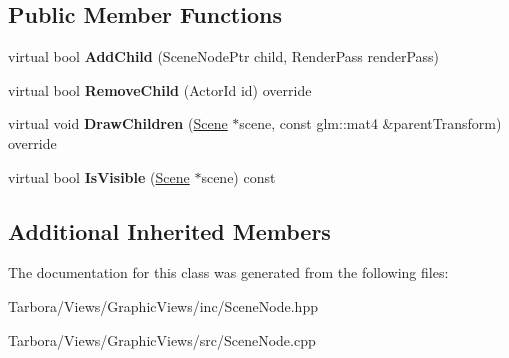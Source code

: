 \subsection*{Public Member Functions}
\begin{DoxyCompactItemize}
\item 
\mbox{\label{classTarbora_1_1RootNode_a95ce817a139455e7a7830bccc3874164}} 
virtual bool {\bfseries Add\+Child} (Scene\+Node\+Ptr child, Render\+Pass render\+Pass)
\item 
\mbox{\label{classTarbora_1_1RootNode_a62ddf56ce11926d03f83e68cd52dcc19}} 
virtual bool {\bfseries Remove\+Child} (Actor\+Id id) override
\item 
\mbox{\label{classTarbora_1_1RootNode_a02923a7df28da2b068647e139740d379}} 
virtual void {\bfseries Draw\+Children} (\hyperlink{classTarbora_1_1Scene}{Scene} $\ast$scene, const glm\+::mat4 \&parent\+Transform) override
\item 
\mbox{\label{classTarbora_1_1RootNode_a20b9a487a7de21816ca909490d00fcae}} 
virtual bool {\bfseries Is\+Visible} (\hyperlink{classTarbora_1_1Scene}{Scene} $\ast$scene) const
\end{DoxyCompactItemize}
\subsection*{Additional Inherited Members}


The documentation for this class was generated from the following files\+:\begin{DoxyCompactItemize}
\item 
Tarbora/\+Views/\+Graphic\+Views/inc/Scene\+Node.\+hpp\item 
Tarbora/\+Views/\+Graphic\+Views/src/Scene\+Node.\+cpp\end{DoxyCompactItemize}
